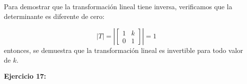 \documentclass[12pt]{article}
\begin{document}
\begin{figure}[htbp]
    \centering
\end{figure}

Para demostrar que la transformación lineal tiene inversa, verificamos que la determinante es diferente de cero:

\begin{equation}
    \left| T \right| =
    \left | \begin{bmatrix}
        1 & k\\ 
        0 & 1
    \end{bmatrix} \right | = 1
\end{equation}
entonces, se demuestra que la transformación lineal es invertible para todo valor de $k$.

%
\noindent \textbf{Ejercicio 17:}
\end{document}
